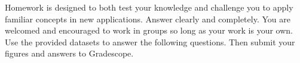 \documentclass[12pt]{article}
\begin{document}
Homework is designed to both test your knowledge and challenge you to apply familiar concepts in new applications. Answer clearly and completely. You are welcomed and encouraged to work in groups so long as your work is your own. Use the provided datasets to answer the following questions. Then submit your figures and answers to Gradescope.
\end{document}
